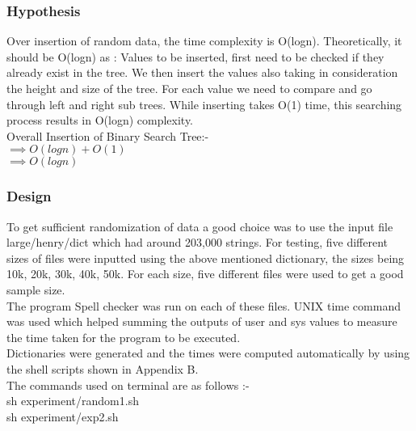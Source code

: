 \documentclass[a4]{article}
\begin{document}
\subsubsection{Hypothesis}
Over insertion of random data, the time complexity is O(logn).
Theoretically, it should be O(logn) as :
Values to be inserted, first need to be checked if they already exist in the tree. We then insert the values also taking in consideration the height and size of the tree.  For each value we need to compare and go through left and right sub trees. While inserting takes O(1) time, this searching process results in O(logn) complexity.\\

Overall Insertion of Binary Search Tree:- \\
$\implies O(log n) + O(1)$\\
$\implies O(log n)$
                                        
\subsubsection{Design}
To get sufficient randomization of data a good choice was to use the input file large/henry/dict which had around 203,000 strings. For testing, five different sizes of files were inputted using the above mentioned dictionary, the sizes being 10k, 20k, 30k, 40k, 50k. For each size, five different files were used to get a good sample size.\\
The program Spell checker was run on each of these files.
UNIX time command was used which helped summing the outputs of user and sys values to measure the time taken for the program to be executed. \\
Dictionaries were generated and the times were computed automatically by using the shell scripts shown in Appendix B. \\
The commands used on terminal are as follows :- \\
sh experiment/random1.sh \\
sh experiment/exp2.sh \\
\end{document}
